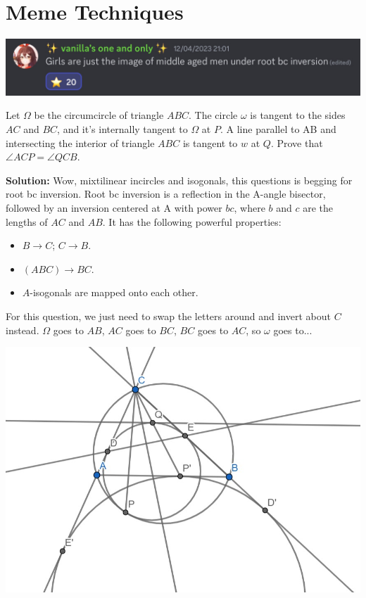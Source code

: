 \documentclass{scrartcl}
\begin{document}
\section{Meme Techniques}
\begin{center}
    \includegraphics[scale=0.3]{celestia_quote.png}
\end{center}
\begin{problem} [EGMO 2013/5]
Let $\Omega$ be the circumcircle of triangle $ABC$. The circle $\omega$ is tangent to the sides $AC$ and $BC$, and it's internally tangent to $\Omega$ at $P$. A line parallel to AB and intersecting the interior of triangle $ABC$ is tangent to $w$ at $Q$. Prove that $\angle ACP = \angle QCB$.
\end{problem}
\textbf{Solution:} Wow, mixtilinear incircles and isogonals, this questions is begging for root bc inversion. \newline
Root bc inversion is a reflection in the A-angle bisector, followed by an inversion centered at A with power $bc$, where $b$ and $c$ are the lengths of $AC$ and $AB$. It has the following powerful properties:
\begin{itemize}
  \item $B \rightarrow C$; $C \rightarrow B$.
  \item $(ABC) \rightarrow BC$.
  \item $A$-isogonals are mapped onto each other. 
\end{itemize}
For this question, we just need to swap the letters around and invert about $C$ instead. $\Omega$ goes to $AB$, $AC$ goes to $BC$, $BC$ goes to $AC$, so $\omega$ goes to...\newline
\begin{center}
    \includegraphics[scale=0.8]{egmo20135.jpg}
\end{center}
\end{document}
